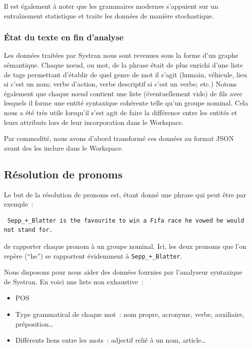 \documentclass[a4paper, 12pt]{article}
\begin{document}
Il est également à noter que les grammaires modernes s'appuient sur un entraînement statistique et traite les données de manière stochastique.

\subsubsection{\'Etat du texte en fin d'analyse}
Les données traitées par Systran nous sont revenues sous la forme d'un graphe sémantique. Chaque nœud, ou mot, de la phrase était de plus enrichi d'une liste de tags permettant d'établir de quel genre de mot il s'agit (humain, véhicule, lieu si c'est un nom; verbe d'action, verbe descriptif si c'est un verbe; etc.) Notons également que chaque nœud contient une liste (éventuellement vide) de fils avec lesquels il forme une entité syntaxique cohérente telle qu'un groupe nominal. Cela nous a été très utile lorsqu'il s'est agit de faire la différence entre les entités et leurs attributs lors de leur incorporation dans le Workspace.

Par commodité, nous avons d'abord transformé ces données au format JSON avant des les inclure dans le Workspace.

\subsection{Résolution de pronoms}

Le but de la résolution de pronoms est, étant donné une phrase qui peut être par exemple~:

\begin{verbatim}
 Sepp_+_Blatter is the favourite to win a Fifa race he vowed he would not stand for.
\end{verbatim}
de rapporter chaque pronom à un groupe nominal. Ici, les deux pronoms que l'on repère (``he'') se rapportent évidemment à \verb|Sepp_+_Blatter|.

Nous disposons pour nous aider des données fournies par l'analyseur syntaxique de Systran. En voici une liste non exhaustive~:
\begin{itemize}
 \item POS
 \item Type grammatical de chaque mot~: nom propre, acronyme, verbe, auxiliaire, préposition\ldots{}
 \item Différents liens entre les mots~: adjectif relié à un nom, article\ldots{}
\end{itemize}
\end{document}
